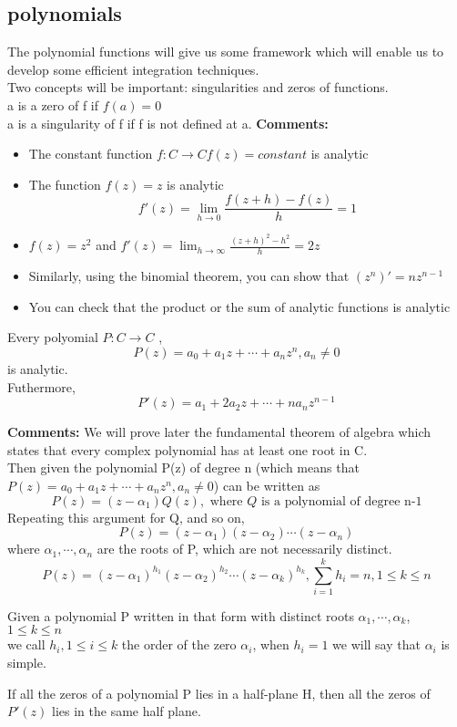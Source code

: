 \subsection{polynomials}
The polynomial functions will give us some framework which will enable us to develop some efficient integration techniques.
\\Two concepts will be important: singularities and zeros of functions.
\\ a is a zero of f if $ f(a)=0 $
\\ a is a singularity of f if f is not defined at a.
\textbf{Comments:}
\begin{itemize}
\item The constant function $ f:C\rightarrow C f(z)=constant$ is analytic
\item The function $ f(z)=z $ is analytic$$
    f'(z)=\lim_{h\rightarrow0}\frac{f(z+h)-f(z)}{h}=1
$$ 
\item $ f(z)=z^2 $ and $ f'(z)=\lim_{h\rightarrow\infty}\frac{(z+h)^2-h^2}{h}=2z $
\item Similarly, using the binomial theorem, you can show that $ (z^n)'=nz^{n-1} $ 
\item You can check that the product or the sum of analytic functions is analytic  
\end{itemize}
\begin{lemma}[]{}
Every polyomial $ P:C\rightarrow C $ ,$$
    P(z)=a_0+a_1z+\cdots+a_nz^n,a_n\neq 0
$$  is analytic.
\\Futhermore,
$$
    P'(z)=a_1+2a_2z+\cdots+na_nz^{n-1}
    $$
\end{lemma}
\textbf{Comments:}
We will prove later the fundamental theorem of algebra which states that every complex polynomial has at least one root in C.
\\Then given the polynomial P(z) of degree n (which means that $ P(z)=a_0+a_1z+\cdots+a_nz^n,a_n\neq 0$)
can be written as$$
    P(z)=(z-\alpha_1)Q(z),\text{ where } Q \text{ is a polynomial of degree n-1}
$$
Repeating this argument for Q, and so on, $$
    P(z)=(z-\alpha_1)(z-\alpha_2)\cdots(z-\alpha_n)
$$ where $ \alpha_1,\cdots,\alpha_n $ are the roots of P, which are not necessarily distinct.
$$
    P(z)=(z-\alpha_1)^{h_1}(z-\alpha_2)^{h_2}\cdots(z-\alpha_k)^{h_k},\sum_{i=1}^{k}h_i=n,1\leq k\leq n
$$ 
\begin{definition}[]{}
Given a polynomial P written in that form with distinct roots $ \alpha_1,\cdots,\alpha_k $, $ 1\leq k\leq n $
\\we call $ h_i ,1\leq i \leq k$ the order of the zero $ \alpha_i $, when $ h_i=1 $ we will say that $ \alpha_i $ is simple.  
\end{definition}
\begin{theorem}{}
If all the zeros of a polynomial P lies in a half-plane H, then all the zeros of $ P'(z) $ lies in the same half plane. 
\end{theorem}
